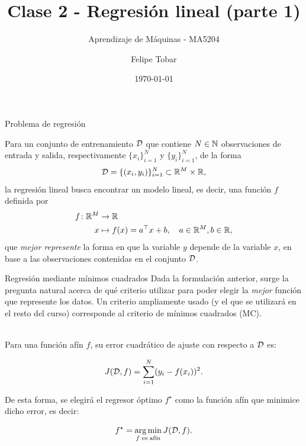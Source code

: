 \documentclass[handout, 9pt]{beamer}
\title{Clase 2 - Regresión lineal (parte 1)}
\subtitle{Aprendizaje de Máquinas - MA5204}
\date{\today}
\author{Felipe Tobar}
\institute{Department of Mathematical Engineering \&\\ Center for Mathematical Modelling\\Universidad de Chile}
\begin{document}
\begin{frame}
  \titlepage
\end{frame}


\begin{frame}{Problema de regresión}
	
Para un conjunto de entrenamiento ${\mathcal D}$ que contiene $N\in{\mathbb N}$ observaciones de entrada y salida, respectivamente $\{x_i\}_{i=1}^N$ y $\{y_i\}_{i=1}^N$, de la forma
\begin{equation*}
	{\mathcal D}=\{(x_i,y_i)\}_{i=1}^N\subset \mathbb{R}^M \times \mathbb{R},
	\label{eq:training_set}
\end{equation*}\pause
la regresión lineal busca encontrar un modelo lineal, es decir, una función $f$ definida por 
\begin{align*}
  f \colon \mathbb{R}^M &\to \mathbb{R}\nonumber\\
  x &\mapsto f(x)=a^\top x + b,\quad a\in\mathbb{R}^M,b\in\mathbb{R},
\end{align*}
que \emph{mejor represente} la forma en que la variable $y$ depende de la variable $x$, en base a las observaciones contenidas en el conjunto ${\mathcal D}$.

\end{frame}

\begin{frame}{Regresión mediante mínimos cuadrados}
Dada la formulación anterior, surge la pregunta natural acerca de qué criterio utilizar para poder elegir la \emph{mejor} función que represente los datos. Un criterio ampliamente usado (y el que se utilizará en el resto del curso) corresponde al criterio de mínimos cuadrados (MC).\\~\ \pause

Para una función afín $f$, su error cuadrático de ajuste con respecto a ${\mathcal D}$ es:

\begin{equation*}
	J({\mathcal D},f) = \sum_{i=1}^N(y_i-f(x_i))^2.
	\label{eq:least_squares_cost}
\end{equation*}\pause

De esta forma, se elegirá el regresor óptimo $f^\star$ como la función afín que minimice dicho error, es decir:

\begin{equation*}
	f^\star = \operatorname*{arg\,min}_{f\text{ es afín}} J({\mathcal D},f).
\end{equation*}

\end{frame}
\end{document}
